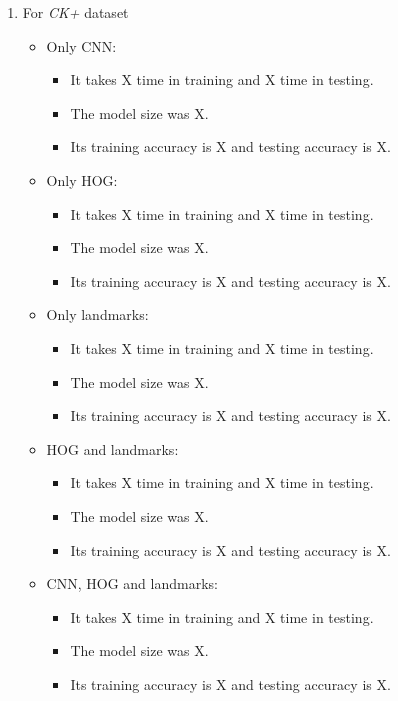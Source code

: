 \begin{enumerate}
\begin{itemize}
\begin{itemize}
        \end{itemize}
\end{itemize}
\item For \textit{CK+} dataset \newline
\begin{itemize}
    \item Only CNN: 
        \begin{itemize}
            \item It takes X time in training and X time in testing.
            \item The model size was X.
            \item Its training accuracy is X and testing accuracy is X.
        \end{itemize}
    \item Only HOG: 
        \begin{itemize}
            \item It takes X time in training and X time in testing.
            \item The model size was X.
            \item Its training accuracy is X and testing accuracy is X.
        \end{itemize}
    \item Only landmarks: 
        \begin{itemize}
            \item It takes X time in training and X time in testing.
            \item The model size was X.
            \item Its training accuracy is X and testing accuracy is X.
        \end{itemize}
    \item HOG and landmarks: 
        \begin{itemize}
            \item It takes X time in training and X time in testing.
            \item The model size was X.
            \item Its training accuracy is X and testing accuracy is X.
        \end{itemize}
    \item CNN, HOG and landmarks: 
        \begin{itemize}
            \item It takes X time in training and X time in testing.
            \item The model size was X.
            \item Its training accuracy is X and testing accuracy is X.

\end{itemize}
\end{itemize}
\end{enumerate}
